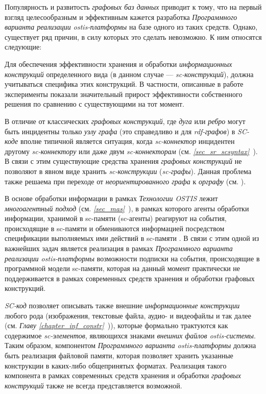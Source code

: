 Популярность и развитость \textit{графовых баз данных} приводит к тому, что на первый взгляд целесообразным и эффективным кажется разработка \textit{Программного варианта реализации ostis-платформы} на базе одного из таких средств. Однако, существует ряд причин, в силу которых это сделать невозможно. К ним относятся следующие:
\begin{textitemize}
	\item Для обеспечения эффективности хранения и обработки \textit{информационных конструкций} определенного вида (в данном случае --- \textit{sc-конструкций}), должна учитываться специфика этих конструкций. В частности, описанные в работе  эксперименты показали значительный прирост эффективности собственного решения по сравнению с существующими на тот момент.
	\item В отличие от классических \textit{графовых конструкций}, где \textit{дуга} или \textit{ребро} могут быть инцидентны только \textit{узлу} \textit{графа} (это справедливо и для \textit{rdf-графов}) в \textit{SC-коде} вполне типичной является ситуация, когда \textit{sc-коннектор} инцидентен другому \textit{sc-коннектору} или даже двум \textit{sc-коннекторам} (см. \textit{\ref{sec_sr_scsyntax}~}). В связи с этим существующие средства хранения \textit{графовых конструкций} не позволяют в явном виде хранить \textit{sc-конструкции} (\textit{sc-графы}). Данная проблема также решаема при переходе от \textit{неориентированного графа} к \textit{орграфу} (см. ).
	\item В основе обработки информации в рамках \textit{Технологии OSTIS} лежит \textit{многоагентный подход} (см. \textit{\ref{sec_mas}~}), в рамках которого агенты обработки информации, хранимой в sc-памяти (sc-агенты) реагируют на события, происходящие в sc-памяти и обмениваются информацией посредством спецификации выполняемых ими действий в sc-памяти . В связи с этим одной из важнейших задач является реализация в рамках \textit{Программного варианта реализации ostis-платформы} возможности подписки на события, происходящие в программной модели sc-памяти, которая на данный момент практически не поддерживается в рамках современных средств хранения и обработки графовых конструкций.
	\item \textit{SC-код} позволяет описывать также внешние \textit{информационные конструкции} любого рода (изображения, текстовые файла, аудио- и видеофайлы и так далее (см. \textit{Главу \ref{chapter_inf_constr}~})), которые формально трактуются как содержимое \textit{sc-элементов}, являющихся знаками \textit{внешних файлов ostis-системы}. Таким образом, компонентом \textit{Программного варианта ostis-платформы} должна быть реализация файловой памяти, которая позволяет хранить указанные конструкции в каких-либо общепринятых форматах. Реализация такого компонента в рамках современных средств хранения и обработки \textit{графовых конструкций} также не всегда представляется возможной.
\end{textitemize}

